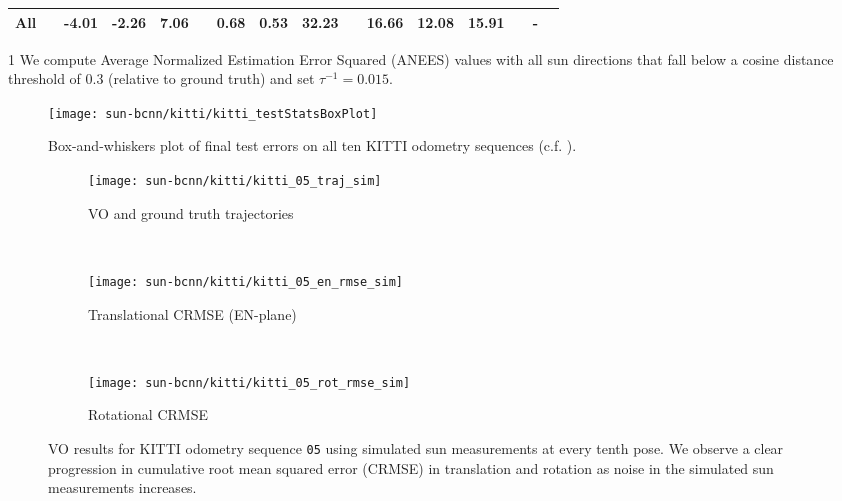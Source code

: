 \begin{table}
{\begin{threeparttable}
\begin{tabular}{@{}cccccccccccccccc@{}}
All                &  & -4.01  & -2.26  & 7.06           &  & 0.68   & 0.53   & 32.23           &  & 16.66 & 12.08  & 15.91 & & - &  \\ \bottomrule    
\end{tabular}
\begin{tablenotes}
	\item[1] We compute Average Normalized Estimation Error Squared (ANEES) values with all sun directions that fall below a cosine distance threshold of $0.3$ (relative to ground truth) and set $\tau^{-1} = 0.015$.
 \end{tablenotes}
\end{threeparttable}
}
\end{table}

\begin{figure}
    \centering
    \texttt{[image: sun-bcnn/kitti/kitti\_testStatsBoxPlot]}
    \caption{Box-and-whiskers plot of final test errors on all ten KITTI odometry sequences (c.f. ).}
    \label{fig:kitti_test_error_whiskers}
\end{figure}

\begin{figure}
	\centering
	 \begin{subfigure}{0.42\textwidth}
    	\texttt{[image: sun-bcnn/kitti/kitti\_05\_traj\_sim]}
        \caption{VO and ground truth trajectories}
    \end{subfigure}
    ~
    \begin{subfigure}{0.42\textwidth}
    	\vspace{-8pt}
    	\texttt{[image: sun-bcnn/kitti/kitti\_05\_en\_rmse\_sim]}
        \caption{Translational CRMSE (EN-plane)}
    \end{subfigure}
    ~
    \begin{subfigure}{0.42\textwidth}
    	\texttt{[image: sun-bcnn/kitti/kitti\_05\_rot\_rmse\_sim]}
        \caption{Rotational CRMSE}
    \end{subfigure}

    \caption{VO results for KITTI odometry sequence \texttt{05} using simulated sun measurements at every tenth pose. We observe a clear progression in cumulative root mean squared error (CRMSE) in translation and rotation as noise in the simulated sun measurements increases.}
     \label{fig:kitti-vo-sim-results}
\end{figure}

